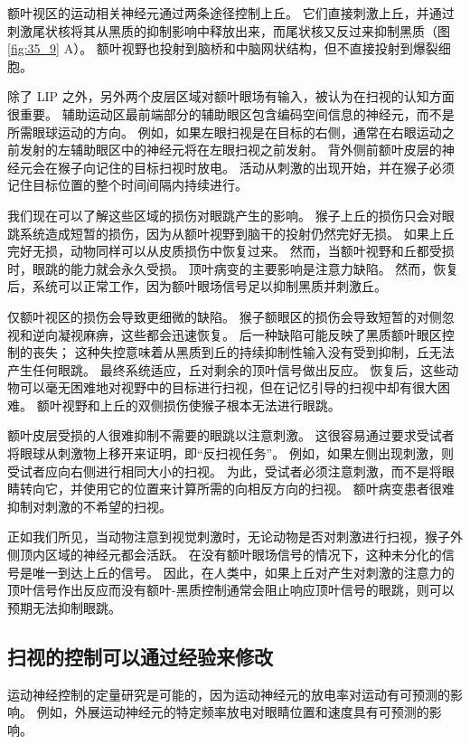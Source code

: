 额叶视区的运动相关神经元通过两条途径控制上丘。
它们直接刺激上丘，并通过刺激尾状核将其从黑质的抑制影响中释放出来，而尾状核又反过来抑制黑质（图 \ref{fig:35_9} A）。
额叶视野也投射到脑桥和中脑网状结构，但不直接投射到爆裂细胞。


除了 LIP 之外，另外两个皮层区域对额叶眼场有输入，被认为在扫视的认知方面很重要。
辅助运动区最前端部分的辅助眼区包含编码空间信息的神经元，而不是所需眼球运动的方向。
例如，如果左眼扫视是在目标的右侧，通常在右眼运动之前发射的左辅助眼区中的神经元将在左眼扫视之前发射。 背外侧前额叶皮层的神经元会在猴子向记住的目标扫视时放电。
活动从刺激的出现开始，并在猴子必须记住目标位置的整个时间间隔内持续进行。


我们现在可以了解这些区域的损伤对眼跳产生的影响。
猴子上丘的损伤只会对眼跳系统造成短暂的损伤，因为从额叶视野到脑干的投射仍然完好无损。
如果上丘完好无损，动物同样可以从皮质损伤中恢复过来。
然而，当额叶视野和丘都受损时，眼跳的能力就会永久受损。
顶叶病变的主要影响是注意力缺陷。
然而，恢复后，系统可以正常工作，因为额叶眼场信号足以抑制黑质并刺激丘。


仅额叶视区的损伤会导致更细微的缺陷。
猴子额眼区的损伤会导致短暂的对侧忽视和逆向凝视麻痹，这些都会迅速恢复。
后一种缺陷可能反映了黑质额叶眼区控制的丧失；
这种失控意味着从黑质到丘的持续抑制性输入没有受到抑制，丘无法产生任何眼跳。
最终系统适应，丘对剩余的顶叶信号做出反应。
恢复后，这些动物可以毫无困难地对视野中的目标进行扫视，但在记忆引导的扫视中却有很大困难。
额叶视野和上丘的双侧损伤使猴子根本无法进行眼跳。


额叶皮层受损的人很难抑制不需要的眼跳以注意刺激。
这很容易通过要求受试者将眼球从刺激物上移开来证明，即“反扫视任务”。
例如，如果左侧出现刺激，则受试者应向右侧进行相同大小的扫视。
为此，受试者必须注意刺激，而不是将眼睛转向它，并使用它的位置来计算所需的向相反方向的扫视。
额叶病变患者很难抑制对刺激的不希望的扫视。


正如我们所见，当动物注意到视觉刺激时，无论动物是否对刺激进行扫视，猴子外侧顶内区域的神经元都会活跃。
在没有额叶眼场信号的情况下，这种未分化的信号是唯一到达上丘的信号。
因此，在人类中，如果上丘对产生对刺激的注意力的顶叶信号作出反应而没有额叶-黑质控制通常会阻止响应顶叶信号的眼跳，则可以预期无法抑制眼跳。


\subsection{扫视的控制可以通过经验来修改}

运动神经控制的定量研究是可能的，因为运动神经元的放电率对运动有可预测的影响。
例如，外展运动神经元的特定频率放电对眼睛位置和速度具有可预测的影响。


